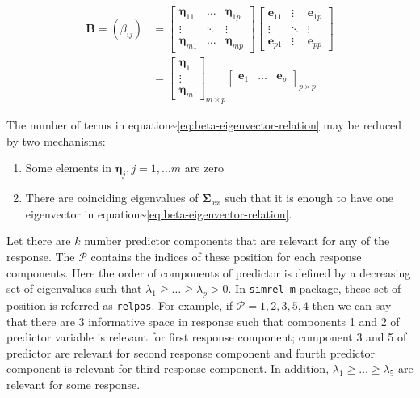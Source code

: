 \documentclass[12pt,A4paper,authoryear]{elsarticle} %
\providecommand{\tightlist}{%
  \setlength{\itemsep}{0pt}\setlength{\parskip}{0pt}}
\begin{document}
\begin{align}
\mathbf{B} = \left(\beta_{ij}\right) &= 
  \begin{bmatrix} 
    \boldsymbol{\eta}_{11} & \ldots & \boldsymbol{\eta}_{1p} \\
    \vdots                 & \ddots & \vdots \\
    \boldsymbol{\eta}_{m1} & \ldots & \boldsymbol{\eta}_{mp}
  \end{bmatrix} 
  \begin{bmatrix} 
    \mathbf{e}_{11} & \vdots & \mathbf{e}_{1p} \\
    \vdots          & \ddots & \vdots \\
    \mathbf{e}_{p1} & \vdots & \mathbf{e}_{pp}
  \end{bmatrix} \\ &= 
  \begin{bmatrix}\boldsymbol{\eta}_{1} \\ \vdots \\ \boldsymbol{\eta}_{m}\end{bmatrix}_{m \times p}
  \begin{bmatrix}\mathbf{e}_{1} & \ldots & \mathbf{e}_{p}\end{bmatrix}_{p \times p} 
\label{eq:beta-eigenvector-relation}
\end{align}

The number of terms in
equation\textasciitilde{}\eqref{eq:beta-eigenvector-relation} may be
reduced by two mechanisms:

\begin{enumerate}
\def\labelenumi{\alph{enumi})}
\tightlist
\item
  Some elements in \(\boldsymbol{\eta}_j, j = 1, \ldots m\) are zero
\item
  There are coinciding eigenvalues of \(\boldsymbol{\Sigma}_{xx}\) such
  that it is enough to have one eigenvector in
  equation\textasciitilde{}\eqref{eq:beta-eigenvector-relation}.
\end{enumerate}

Let there are \(k\) number predictor components that are relevant for
any of the response. The \(\mathcal{P}\) contains the indices of these
position for each response components. Here the order of components of
predictor is defined by a decreasing set of eigenvalues such that
\(\lambda_1 \ge \ldots \ge \lambda_p > 0\). In \texttt{simrel-m}
package, these set of position is referred as \texttt{relpos}. For
example, if \(\mathcal{P} = {{1, 2}, {3, 5}, {4}}\) then we can say that
there are 3 informative space in response such that components 1 and 2
of predictor variable is relevant for first response component;
component 3 and 5 of predictor are relevant for second response
component and fourth predictor component is relevant for third response
component. In addition, \(\lambda_1 \ge \ldots \ge \lambda_5\) are
relevant for some response.
\end{document}
